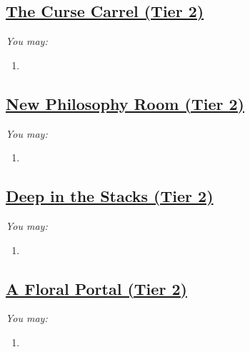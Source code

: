 \documentclass[sheet]{GL2020}
\begin{document}
\clearpage


\begin{center}\section*{\underline{The Curse Carrel (Tier 2)}}\end{center}
\label{CurseCarrel}

\begingroup
\itshape
You may:
\begin{enumerate}[A]
  \item 
\end{enumerate}
\endgroup

\clearpage

\begin{center}\section*{\underline{New Philosophy Room (Tier 2)}}\end{center}
\label{NewPhilosophy}

\begingroup
\itshape
You may:
\begin{enumerate}[A]
  \item 
\end{enumerate}
\endgroup

\clearpage

\begin{center}\section*{\underline{Deep in the Stacks (Tier 2)}}\end{center}
\label{DeepStacks}

\begingroup
\itshape
You may:
\begin{enumerate}[A]
  \item 
\end{enumerate}
\endgroup

\clearpage

\begin{center}\section*{\underline{A Floral Portal (Tier 2)}}\end{center}
\label{FloralPortal}

\begingroup
\itshape
You may:
\begin{enumerate}[A]
  \item 
\end{enumerate}
\endgroup
\end{document}
